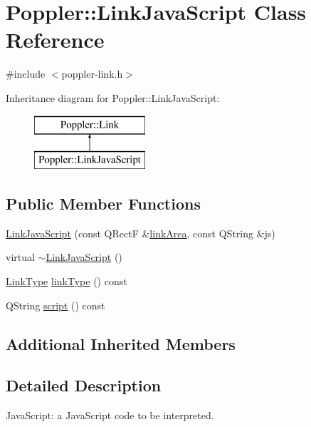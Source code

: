 \hypertarget{class_poppler_1_1_link_java_script}{}\section{Poppler\+:\+:Link\+Java\+Script Class Reference}
\label{class_poppler_1_1_link_java_script}


{\ttfamily \#include $<$poppler-\/link.\+h$>$}

Inheritance diagram for Poppler\+:\+:Link\+Java\+Script\+:\begin{figure}[H]
\begin{center}
\leavevmode
\includegraphics[height=2.000000cm]{class_poppler_1_1_link_java_script}
\end{center}
\end{figure}
\subsection*{Public Member Functions}
\begin{DoxyCompactItemize}
\item 
\hyperlink{class_poppler_1_1_link_java_script_af80931f63d3a9793111609badb99faa9}{Link\+Java\+Script} (const Q\+RectF \&\hyperlink{class_poppler_1_1_link_adb525b65cfac39dcdba3f59faa57a0bf}{link\+Area}, const Q\+String \&js)
\item 
virtual \hyperlink{class_poppler_1_1_link_java_script_a1462b44d39525ee518ea291c481f787d}{$\sim$\+Link\+Java\+Script} ()
\item 
\hyperlink{class_poppler_1_1_link_af0dacfa77a548bb043dbae4bb9dc6c1e}{Link\+Type} \hyperlink{class_poppler_1_1_link_java_script_a4fda2a64f798cdec7fffc0a8061c4cd1}{link\+Type} () const
\item 
Q\+String \hyperlink{class_poppler_1_1_link_java_script_ab6211e681dda8fcf1de022cb245fc5b2}{script} () const
\end{DoxyCompactItemize}
\subsection*{Additional Inherited Members}


\subsection{Detailed Description}
Java\+Script\+: a Java\+Script code to be interpreted.

